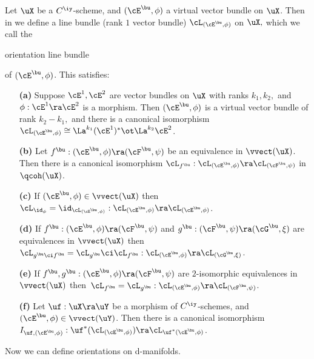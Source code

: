 \documentclass{article}
\begin{document}
\begin{thm} Let\/ $\uX$ be a $C^\iy$-scheme, and\/ $(\cE^\bu,\phi)$
a virtual vector bundle on $\uX$. Then in {\rm\cite[\S 4.5]{Joyc6}}
we define a line bundle (rank\/ $1$ vector bundle) $\cL_{\smash{(\cE^\bu,\phi)}}$ on
$\uX,$ which we call the \begin{bfseries}orientation line
bundle\end{bfseries} of\/
$(\cE^\bu,\phi)$. This satisfies:
\begin{itemize}
\setlength{\itemsep}{0pt}
\setlength{\parsep}{0pt}
\item[{\bf(a)}] Suppose $\cE^1,\cE^2$ are vector bundles on $\uX$ with
ranks $k_1,k_2,$ and\/ $\phi:\cE^1\ra\cE^2$ is a morphism. Then
$(\cE^\bu,\phi)$ is a virtual vector bundle of rank\/ $k_2-k_1,$
and there is a canonical isomorphism\/~$\cL_{\smash{
(\cE^\bu,\phi)}}\cong \La^{k_1}(\cE^1)^*\ot\La^{k_2}\cE^2$.
\item[{\bf(b)}] Let\/ $f^\bu: (\cE^\bu,\phi)\ra(\cF^\bu,\psi)$
be an equivalence in $\vvect(\uX)$. Then there is a canonical
isomorphism\/ $\cL_{f^\bu}:\cL_{\smash{(\cE^\bu,\phi)}}\ra
\cL_{\smash{ (\cF^\bu,\psi)}}$ in\/~$\qcoh(\uX)$.
\item[{\bf(c)}] If\/ $(\cE^\bu,\phi)\in\vvect(\uX)$
then\/~$\cL_{\id_\phi}=\id_{\cL_{\smash{(\cE^\bu,\phi)}}}:
\cL_{\smash{(\cE^\bu,\phi)}}\ra\cL_{\smash{(\cE^\bu,\phi)}}$.
\item[{\bf(d)}] If\/ $f^\bu:(\cE^\bu,\phi)\ra(\cF^\bu,\psi)$ and\/
$g^\bu:(\cF^\bu,\psi)\ra(\cG^\bu,\xi)$ are equivalences in
$\vvect(\uX)$ then $\cL_{g^\bu\ci f^\bu}=\cL_{g^\bu}\ci\cL_{
f^\bu}:\cL_{\smash{(\cE^\bu,\phi)}}\ra\cL_{\smash{(\cG^\bu,\xi)}}$.
\item[{\bf(e)}] If\/ $f^\bu,g^\bu:(\cE^\bu,\phi)\ra(\cF^\bu,\psi)$
are $2$-isomorphic equivalences in $\vvect(\uX)$ then\/~$\cL_{
f^\bu}=\cL_{g^\bu} :\cL_{\smash{(\cE^\bu,\phi)}}\ra\cL_{\smash{
(\cF^\bu,\psi)}}$.
\item[{\bf(f)}] Let\/ $\uf:\uX\ra\uY$ be a morphism of\/
$C^\iy$-schemes, and\/ $(\cE^\bu,\phi)\in\vvect(\uY)$. Then
there is a canonical isomorphism\/~$I_{\uf,(\cE^\bu,\phi)}:
\uf^*(\cL_{\smash{(\cE^\bu, \phi)}})\ra
\cL_{\smash{\uf^*(\cE^\bu,\phi)}}$.
\end{itemize}
\label{ds4thm14}
\end{thm}

Now we can define orientations on d-manifolds.
\end{document}
